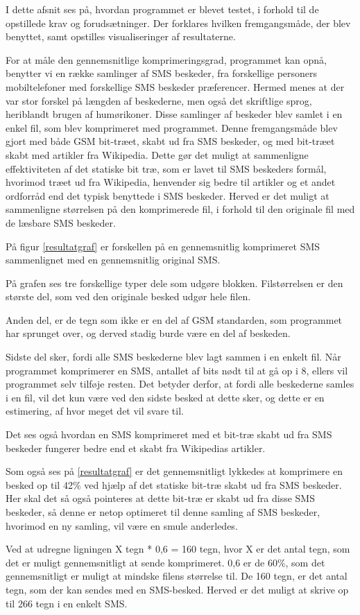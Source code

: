 I dette afsnit ses på, hvordan programmet er blevet testet, i forhold til de opstillede krav og 
forudsætninger. Der forklares hvilken fremgangsmåde, der blev benyttet, samt opstilles visualiseringer af 
resultaterne.

For at måle den gennemsnitlige komprimeringsgrad, programmet kan opnå, benytter vi en række samlinger 
af SMS beskeder, fra forskellige personers mobiltelefoner med forskellige SMS beskeder præferencer. Hermed menes at der 
var stor forskel på længden af beskederne, men også det skriftlige sprog, heriblandt brugen af 
humørikoner.
Disse samlinger af beskeder blev samlet i en enkel fil, som blev komprimeret med programmet.
Denne fremgangsmåde blev gjort med både GSM bit-træet, skabt ud fra SMS beskeder, og med bit-træet skabt med 
artikler fra Wikipedia. Dette gør det muligt at sammenligne effektiviteten af det statiske bit træ, som 
er lavet til SMS beskeders formål, hvorimod træet ud fra Wikipedia, henvender sig bedre til artikler og et 
andet ordforråd end det typisk benyttede i SMS beskeder.
Herved er det muligt at sammenligne størrelsen på den komprimerede fil, i forhold til den originale fil 
med de læsbare SMS beskeder.

På figur \ref{resultatgraf} er forskellen på en gennemsnitlig komprimeret SMS sammenlignet med en 
gennemsnitlig original SMS.

På grafen ses tre forskellige typer dele som udgøre blokken. Filstørrelsen er den største del, som ved den 
originale besked udgør hele filen.

Anden del, er de tegn som ikke er en del af GSM standarden, som programmet har sprunget over, og derved 
stadig burde være en del af beskeden.

Sidste del sker, fordi alle SMS beskederne blev lagt sammen i en enkelt fil. Når programmet komprimerer en SMS, 
antallet af bits nødt til at gå op i 8, ellers vil programmet selv tilføje resten. Det betyder derfor, at 
fordi alle beskederne samles i en fil, vil det kun være ved den sidste besked at dette sker, og dette er 
en estimering, af hvor meget det vil svare til.

Det ses også hvordan en SMS komprimeret med et bit-træ skabt ud fra SMS beskeder fungerer bedre end et skabt 
fra Wikipedias artikler.



Som også ses på \ref{resultatgraf} er det gennemsnitligt lykkedes at komprimere en besked op til 42\% ved 
hjælp af det statiske bit-træ skabt ud fra SMS beskeder.
Her skal det så også pointeres at dette bit-træ er skabt ud fra disse SMS beskeder, så denne er netop optimeret 
til denne samling af SMS beskeder, hvorimod en ny samling, vil være en smule anderledes.

Ved at udregne ligningen X tegn * 0,6 = 160 tegn, hvor X er det antal tegn, som det er muligt 
gennemsnitligt at sende komprimeret. 0,6 er de 60\%, som det gennemsnitligt er muligt at mindske filens 
størrelse til. De 160 tegn, er det antal tegn, som der kan sendes med en SMS-besked.
Herved er det muligt at skrive op til 266 tegn i en enkelt SMS.
